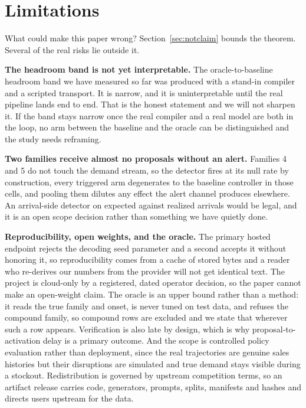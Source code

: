 \section{Limitations}
\label{sec:limitations}

What could make this paper wrong? Section~\ref{sec:notclaim} bounds the theorem.
Several of the real risks lie outside it.

\textbf{The headroom band is not yet interpretable.} The oracle-to-baseline
headroom band we have measured so far was produced with a stand-in compiler and a
scripted transport. It is narrow, and it is uninterpretable until the real
pipeline lands end to end. That is the honest statement and we will not sharpen
it. If the band stays narrow once the real compiler and a real model are both in
the loop, no arm between the baseline and the oracle can be distinguished and the
study needs reframing. 

\textbf{Two families receive almost no proposals without an alert.} Families 4
and 5 do not touch the demand stream, so the detector fires at its null rate by
construction, every triggered arm degenerates to the baseline controller in those
cells, and pooling them dilutes any effect the alert channel produces elsewhere.
An arrival-side detector on expected against realized arrivals would be legal,
and it is an open scope decision rather than something we have quietly done.

\textbf{Reproducibility, open weights, and the oracle.} The primary hosted
endpoint rejects the decoding seed parameter and a second accepts it without
honoring it, so reproducibility comes from a cache of stored bytes and a reader
who re-derives our numbers from the provider will not get identical text. The
project is cloud-only by a registered, dated operator decision, so the paper
cannot make an open-weight claim. The oracle is an upper bound rather than a
method: it reads the true family and onset, is never tuned on test data, and
refuses the compound family, so compound rows are excluded and we state that
wherever such a row appears. Verification is also late by design, which is why
proposal-to-activation delay is a primary outcome. And the scope is controlled
policy evaluation rather than deployment, since the real trajectories are genuine
sales histories but their disruptions are simulated and true demand stays visible
during a stockout. Redistribution is governed by upstream competition terms, so
an artifact release carries code, generators, prompts, splits, manifests and
hashes and directs users upstream for the data.

